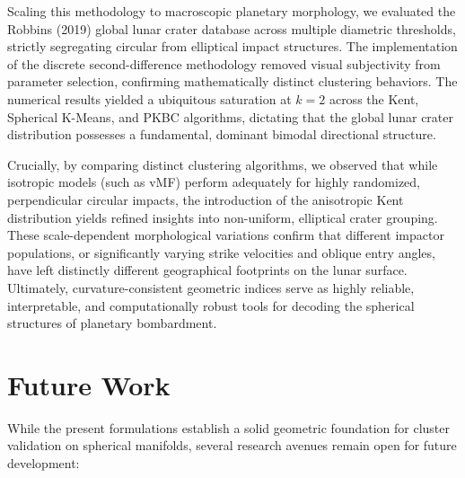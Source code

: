 \documentclass[12pt,a4paper]{report}
\begin{document}
Scaling this methodology to macroscopic planetary morphology, we evaluated the Robbins (2019) global lunar crater database across multiple diametric thresholds, strictly segregating circular from elliptical impact structures. The implementation of the discrete second-difference methodology removed visual subjectivity from parameter selection, confirming mathematically distinct clustering behaviors. The numerical results yielded a ubiquitous saturation at $k=2$ across the Kent, Spherical K-Means, and PKBC algorithms, dictating that the global lunar crater distribution possesses a fundamental, dominant bimodal directional structure.

Crucially, by comparing distinct clustering algorithms, we observed that while isotropic models (such as vMF) perform adequately for highly randomized, perpendicular circular impacts, the introduction of the anisotropic Kent distribution yields refined insights into non-uniform, elliptical crater grouping. These scale-dependent morphological variations confirm that different impactor populations, or significantly varying strike velocities and oblique entry angles, have left distinctly different geographical footprints on the lunar surface. Ultimately, curvature-consistent geometric indices serve as highly reliable, interpretable, and computationally robust tools for decoding the spherical structures of planetary bombardment.

\clearpage
\chapter*{Future Work}

While the present formulations establish a solid geometric foundation for cluster validation on spherical manifolds, several research avenues remain open for future development:
\end{document}
